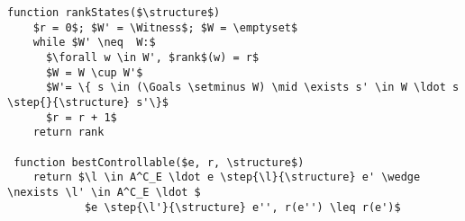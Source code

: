 \begin{lstlisting}[language={pseudocode},label={lst:dcs.aux},caption={Métodos de ranking},float=ht, frame=single]
 function rankStates($\structure$)
    $r = 0$; $W' = \Witness$; $W = \emptyset$
    while $W' \neq  W:$
      $\forall w \in W', $rank$(w) = r$
      $W = W \cup W'$
      $W'= \{ s \in (\Goals \setminus W) \mid \exists s' \in W \ldot s \step{}{\structure} s'\}$
      $r = r + 1$
    return rank

 function bestControllable($e, r, \structure$)
    return $\l \in A^C_E \ldot e \step{\l}{\structure} e' \wedge \nexists \l' \in A^C_E \ldot $
			$e \step{\l'}{\structure} e'', r(e'') \leq r(e')$

\end{lstlisting}


%
%
%   
